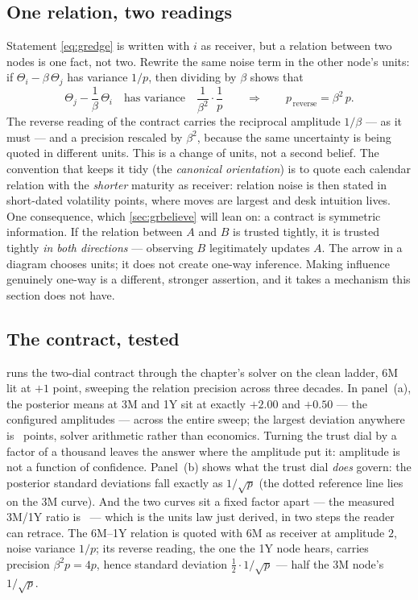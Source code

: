 \subsection{One relation, two readings}

Statement \cref{eq:gredge} is written with $i$ as receiver, but a
relation between two nodes is one fact, not two.  Rewrite the same
noise term in the other node's units: if
$\Theta_i-\beta\,\Theta_j$ has variance $1/p$, then dividing by
$\beta$ shows that
\[
\Theta_j-\frac{1}{\beta}\,\Theta_i
\quad\text{has variance}\quad
\frac{1}{\beta^{2}}\cdot\frac{1}{p}
\qquad\Longrightarrow\qquad
p_{\,\text{reverse}}=\beta^{2}\,p .
\]
The reverse reading of the contract carries the reciprocal amplitude
$1/\beta$ --- as it must --- and a precision rescaled by $\beta^{2}$,
because the same uncertainty is being quoted in different units.  This
is a change of units, not a second belief.  The convention that keeps it
tidy (the \emph{canonical orientation}) is to quote each calendar
relation with the \emph{shorter} maturity as receiver: relation noise
is then stated in short-dated volatility points, where moves are
largest and desk intuition lives.  One consequence, which
\cref{sec:grbelieve} will lean on: a contract is
symmetric information.  If the relation between $A$ and $B$ is
trusted tightly, it is trusted tightly \emph{in both directions} ---
observing $B$ legitimately updates $A$.  The arrow in a diagram
chooses units; it does not create one-way inference.
Making influence genuinely one-way is a different, stronger assertion,
and it takes a mechanism this section does not have.

\subsection{The contract, tested}

 runs the two-dial contract through the chapter's
solver on the clean ladder, 6M lit at $+1$ point, sweeping the
relation precision across three decades.  In panel~(a), the posterior
means at 3M and 1Y sit at exactly $+2.00$ and $+0.50$ --- the
configured amplitudes --- across the entire sweep; the largest
deviation anywhere is \MacGrContractFlat\ points, solver arithmetic
rather than economics.  Turning the trust dial by a factor of a
thousand leaves the answer where the amplitude put it: amplitude is
not a function of confidence.  Panel~(b) shows
what the trust dial \emph{does} govern: the posterior standard
deviations fall exactly as $1/\sqrt{p}$ (the dotted reference line lies
on the 3M curve).  And the two curves sit a fixed factor apart --- the
measured 3M/1Y ratio is \MacGrContractSdRatio\ --- which is the units
law just derived, in two steps the reader can retrace.  The 6M--1Y
relation is quoted with 6M as receiver at amplitude $2$, noise
variance $1/p$; its reverse reading, the one the 1Y node hears,
carries precision $\beta^{2}p=4p$, hence standard deviation
$\tfrac12\cdot1/\sqrt{p}$ --- half the 3M node's $1/\sqrt{p}$.

